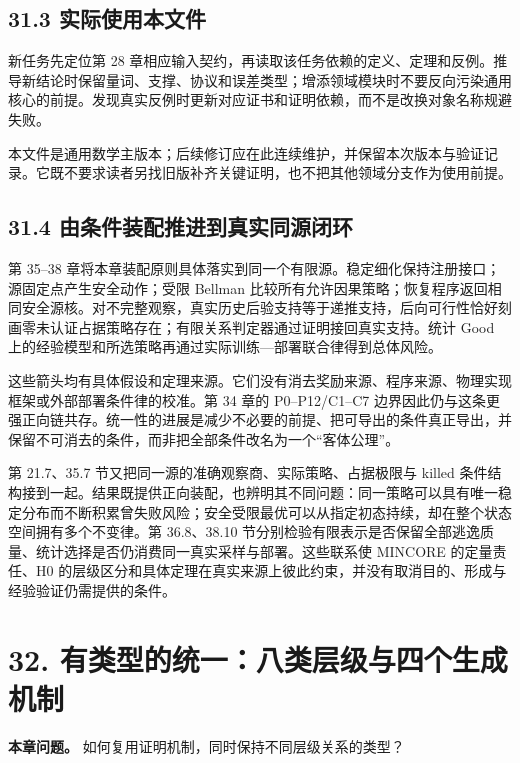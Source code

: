 \documentclass[
  11pt,
  oneside]{book}
\begin{document}
\section{31.3 实际使用本文件}\label{ux5b9eux9645ux4f7fux7528ux672cux6587ux4ef6}

新任务先定位第 28 章相应输入契约，再读取该任务依赖的定义、定理和反例。推导新结论时保留量词、支撑、协议和误差类型；增添领域模块时不要反向污染通用核心的前提。发现真实反例时更新对应证书和证明依赖，而不是改换对象名称规避失败。

本文件是通用数学主版本；后续修订应在此连续维护，并保留本次版本与验证记录。它既不要求读者另找旧版补齐关键证明，也不把其他领域分支作为使用前提。

\section{31.4 由条件装配推进到真实同源闭环}\label{ux7531ux6761ux4ef6ux88c5ux914dux63a8ux8fdbux5230ux771fux5b9eux540cux6e90ux95edux73af}

第 35--38 章将本章装配原则具体落实到同一个有限源。稳定细化保持注册接口；源固定点产生安全动作；受限 Bellman 比较所有允许因果策略；恢复程序返回相同安全源核。对不完整观察，真实历史后验支持等于递推支持，后向可行性恰好刻画零未认证占据策略存在；有限关系判定器通过证明接回真实支持。统计 Good 上的经验模型和所选策略再通过实际训练---部署联合律得到总体风险。

这些箭头均有具体假设和定理来源。它们没有消去奖励来源、程序来源、物理实现框架或外部部署条件律的校准。第 34 章的 P0--P12/C1--C7 边界因此仍与这条更强正向链共存。统一性的进展是减少不必要的前提、把可导出的条件真正导出，并保留不可消去的条件，而非把全部条件改名为一个``客体公理''。

第 21.7、35.7 节又把同一源的准确观察商、实际策略、占据极限与 killed 条件结构接到一起。结果既提供正向装配，也辨明其不同问题：同一策略可以具有唯一稳定分布而不断积累曾失败风险；安全受限最优可以从指定初态持续，却在整个状态空间拥有多个不变律。第 36.8、38.10 节分别检验有限表示是否保留全部逃逸质量、统计选择是否仍消费同一真实采样与部署。这些联系使 MINCORE 的定量责任、H0 的层级区分和具体定理在真实来源上彼此约束，并没有取消目的、形成与经验验证仍需提供的条件。

\chapter{32. 有类型的统一：八类层级与四个生成机制}\label{ch-32}

\textbf{本章问题。} 如何复用证明机制，同时保持不同层级关系的类型？
\end{document}
